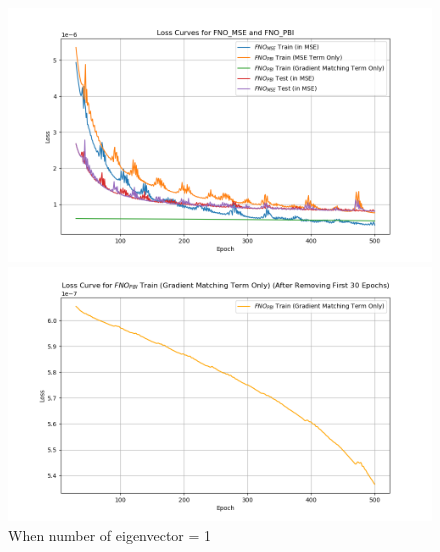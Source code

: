 \documentclass[
]{article}
\begin{document}
\begin{figure}

\begin{minipage}{\linewidth}

\includegraphics[width=1\textwidth,height=\textheight]{../../test/all_loss_1.png}

\end{minipage}%
\newline
\begin{minipage}{\linewidth}

\includegraphics[width=1\textwidth,height=\textheight]{../../test/PBI_term_1.png}

\end{minipage}%

\caption{\label{fig-eig1000}When number of eigenvector = 1}

\end{figure}%
\end{document}
